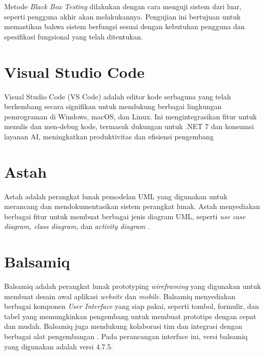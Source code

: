 Metode \textit{Black Box Testing} dilakukan dengan cara menguji sistem dari luar, seperti pengguna akhir akan melakukannya. Pengujian ini bertujuan untuk memastikan bahwa sistem berfungsi sesuai dengan kebutuhan pengguna dan spesifikasi fungsional yang telah ditentukan.

\section{Visual Studio Code}
Visual Studio Code (VS Code) adalah editor kode serbaguna yang telah berkembang secara signifikan untuk mendukung berbagai lingkungan pemrograman di Windows, macOS, dan Linux. Ini mengintegrasikan fitur untuk menulis dan men-debug kode, termasuk dukungan untuk .NET 7 dan konsumsi layanan AI, meningkatkan produktivitas dan efisiensi pengembang \cite{bree2016using}


\section{Astah}
Astah adalah perangkat lunak pemodelan UML yang digunakan untuk merancang dan mendokumentasikan sistem perangkat lunak. Astah menyediakan berbagai fitur untuk membuat berbagai jenis diagram UML, seperti \textit{use case diagram, class diagram,} dan \textit{activity diagram} \cite{hayati2021sistem}.

\section{Balsamiq}
Balsamiq adalah perangkat lunak prototyping \textit{wireframing} yang digunakan untuk membuat desain awal aplikasi \textit{website} dan \emph{mobile}. Balsamiq menyediakan berbagai komponen \textit{User Interface} yang siap pakai, seperti tombol, formulir, dan tabel yang memungkinkan pengembang untuk membuat prototipe dengan cepat dan mudah. Balsamiq juga mendukung kolaborasi tim dan integrasi dengan berbagai alat pengembangan \cite{balsamiq}. Pada perancangan interface ini, versi balsamiq yang digunakan adalah versi 4.7.5.

